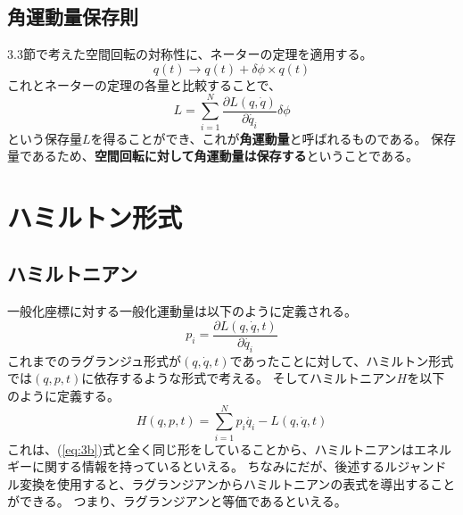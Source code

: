 \documentclass[a4paper]{jsreport}
\begin{document}
        \section{角運動量保存則}
            3.3節で考えた空間回転の対称性に、ネーターの定理を適用する。
            \begin{equation}
                q(t) \to q(t) + \delta \phi \times q(t)
            \end{equation}
            これとネーターの定理の各量と比較することで、
            \begin{equation}
                L = \sum_{i=1}^{N} \frac{\partial L(q, \dot{q})}{\partial \dot{q_i}} \delta \phi
            \end{equation}
            という保存量$L$を得ることができ、これが\textbf{角運動量}と呼ばれるものである。
            保存量であるため、\textbf{空間回転に対して角運動量は保存する}ということである。

    \chapter{ハミルトン形式}
        \section{ハミルトニアン}
            一般化座標に対する一般化運動量は以下のように定義される。
            \begin{equation} \label{eq:4a}
                p_i = \frac{\partial L(q, \dot{q}, t)}{\partial \dot{q_i}}
            \end{equation}
            これまでのラグランジュ形式が$(q, \dot{q}, t)$であったことに対して、ハミルトン形式では$(q, p ,t)$に依存するような形式で考える。
            そしてハミルトニアン$H$を以下のように定義する。
            \begin{equation} \label{eq:4b}
                H(q, p ,t) = \sum_{i=1}^N p_i \dot{q_i} - L(q, \dot{q}, t)
            \end{equation}
            これは、(\ref{eq:3b})式と全く同じ形をしていることから、ハミルトニアンはエネルギーに関する情報を持っているといえる。
            ちなみにだが、後述するルジャンドル変換を使用すると、ラグランジアンからハミルトニアンの表式を導出することができる。
            つまり、ラグランジアンと等価であるといえる。
\end{document}
